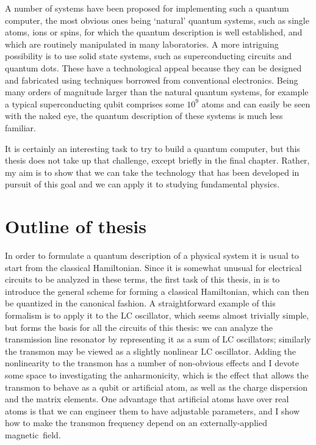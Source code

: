 A number of systems have been proposed for implementing such a quantum computer, the most obvious ones being `natural' quantum systems, such as single atoms, ions or spins, for which the quantum description is well established, and which are routinely manipulated in many laboratories. A more intriguing possibility is to use solid state systems, such as superconducting circuits and quantum dots. These have a technological appeal because they can be designed and fabricated using techniques borrowed from conventional electronics. Being many orders of magnitude larger than the natural quantum systems, for example a typical superconducting qubit comprises some $10^9$ atoms and can easily be seen with the naked eye, the quantum description of these systems is much less familiar.

It is certainly an interesting task to try to build a quantum computer, but this thesis does not take up that challenge, except briefly in the final chapter. Rather, my aim is to show that we can take the technology that has been developed in pursuit of this goal and we can apply it to studying fundamental physics.

\section{Outline of thesis}
In order to formulate a quantum description of a physical system it is usual to start from the classical Hamiltonian. Since it is somewhat unusual for electrical circuits to be analyzed in these terms, the first task of this thesis, in  is to introduce the general scheme for forming a classical Hamiltonian, which can then be quantized in the canonical fashion. A straightforward example of this formalism is to apply it to the LC oscillator, which seems almost trivially simple, but forms the basis for all the circuits of this thesis: we can analyze the transmission line resonator by representing it as a sum of LC oscillators;  similarly the transmon may be viewed as a slightly nonlinear LC oscillator. Adding the nonlinearity to the transmon has a number of non-obvious effects and I devote some space to investigating the anharmonicity, which is the effect that allows the transmon to behave as a qubit or artificial atom, as well as the charge dispersion and the matrix elements. One advantage that artificial atoms have over real atoms is that we can engineer them to have adjustable parameters, and I show how to make the transmon frequency depend on an externally-applied magnetic~field.

